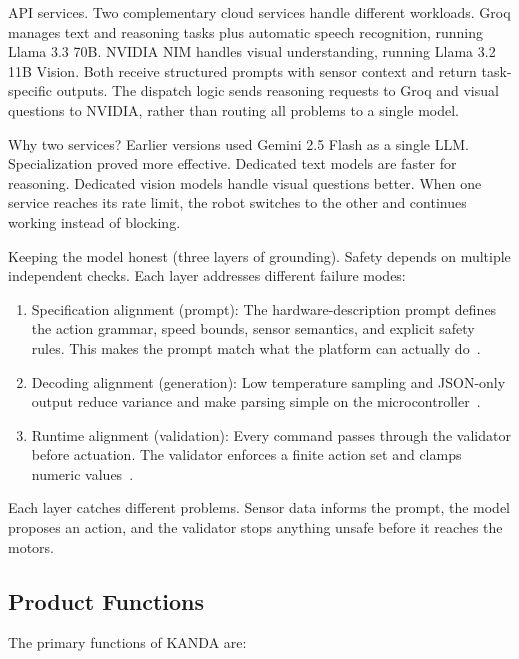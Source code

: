 API services. Two complementary cloud services handle different workloads. Groq manages text and reasoning tasks plus automatic speech recognition, running Llama 3.3 70B. NVIDIA NIM handles visual understanding, running Llama 3.2 11B Vision. Both receive structured prompts with sensor context and return task-specific outputs. The dispatch logic sends reasoning requests to Groq and visual questions to NVIDIA, rather than routing all problems to a single model.

Why two services? Earlier versions used Gemini 2.5 Flash as a single LLM. Specialization proved more effective. Dedicated text models are faster for reasoning. Dedicated vision models handle visual questions better. When one service reaches its rate limit, the robot switches to the other and continues working instead of blocking.

Keeping the model honest (three layers of grounding). Safety depends on multiple independent checks. Each layer addresses different failure modes:

\begin{enumerate}[label=\arabic*., nosep]
  \item Specification alignment (prompt): The hardware-description prompt defines the action grammar, speed bounds, sensor semantics, and explicit safety rules. This makes the prompt match what the platform can actually do~\cite{ahn2022saycan,vemprala2024chatgpt}.
  \item Decoding alignment (generation): Low temperature sampling and JSON-only output reduce variance and make parsing simple on the microcontroller~\cite{}.
  \item Runtime alignment (validation): Every command passes through the validator before actuation. The validator enforces a finite action set and clamps numeric values~\cite{huang2023grounded}.
\end{enumerate}

Each layer catches different problems. Sensor data informs the prompt, the model proposes an action, and the validator stops anything unsafe before it reaches the motors.

\subsection{Product Functions}
\label{subsec:functions}

The primary functions of KANDA are:

